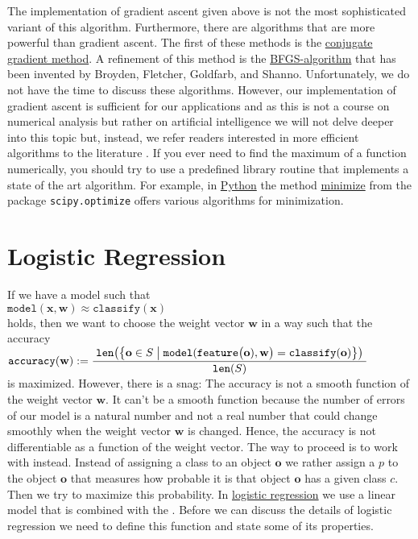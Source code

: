 The implementation of gradient ascent given above is not the most sophisticated variant of this algorithm.
Furthermore, there are algorithms that are more powerful than gradient ascent.  The first of these methods is the
\href{https://en.wikipedia.org/wiki/Conjugate_gradient_method}{conjugate gradient method}.  A
refinement of this method is the
\href{https://en.wikipedia.org/wiki/Broyden-Fletcher-Goldfarb-Shanno_algorithm}{BFGS-algorithm} that
has been invented by Broyden, Fletcher, Goldfarb, and Shanno.  Unfortunately, we do not have the
time to discuss these algorithms.
However, our implementation of gradient ascent is sufficient for our applications and as this is not a course on numerical
analysis but rather on artificial intelligence we will not delve deeper into this topic but, instead, we refer
readers interested in more efficient algorithms to the literature \cite{snyman:2005}.  If you ever need to find
the maximum of a function numerically, you should try to use a predefined library routine that implements a
state of the art algorithm.  For example, in \href{https://www.python.org}{Python} the method
\href{https://docs.scipy.org/doc/scipy/reference/generated/scipy.optimize.minimize.html#scipy.optimize.minimize}{minimize}
from the package \texttt{scipy.optimize} offers various algorithms for minimization.

\section{Logistic Regression}
If we have a model such that 
\\[0.2cm]
\hspace*{1.3cm}
$\mathtt{model}(\mathbf{x}, \mathbf{w}) \approx \mathtt{classify}(\mathbf{x})$
\\[0.2cm]
holds, then we want to choose the weight vector $\mathbf{w}$ in a way such that the accuracy 
\\[0.2cm]
\hspace*{1.3cm}
$\displaystyle \mathtt{accuracy}(\mathbf{w}) := 
\frac{\;\mathtt{len}\bigl(\bigl\{ \mathbf{o} \in S \bigm| \mathtt{model}(\mathtt{feature}\bigl(\mathbf{o}),\mathbf{w}\bigr) = \mathtt{classify}(\mathbf{o})\bigr\}\bigr)\;}{\mathtt{len}(S)}$
\\[0.2cm]
is maximized.  However, there is a snag:  The accuracy is not a smooth function of the weight vector
$\mathbf{w}$.  It can't be a smooth function because the number of errors of our model is a natural number and not a real number
that could change smoothly when the weight vector $\mathbf{w}$ is changed.  Hence, the accuracy is not differentiable as a function
of the weight vector.  The way to proceed is to work with  instead.  Instead of assigning a
class to an object $\mathbf{o}$ we rather assign a  $p$ to the object $\mathbf{o}$ that measures how
probable it is that object $\mathbf{o}$ has a given class $c$.  Then we try to maximize this probability.  In
\href{https://en.wikipedia.org/wiki/Logistic_regression}{logistic regression} we use a linear model that is 
combined with the .  Before we can discuss the details of logistic regression we need to
define this function and state some of its properties.  

